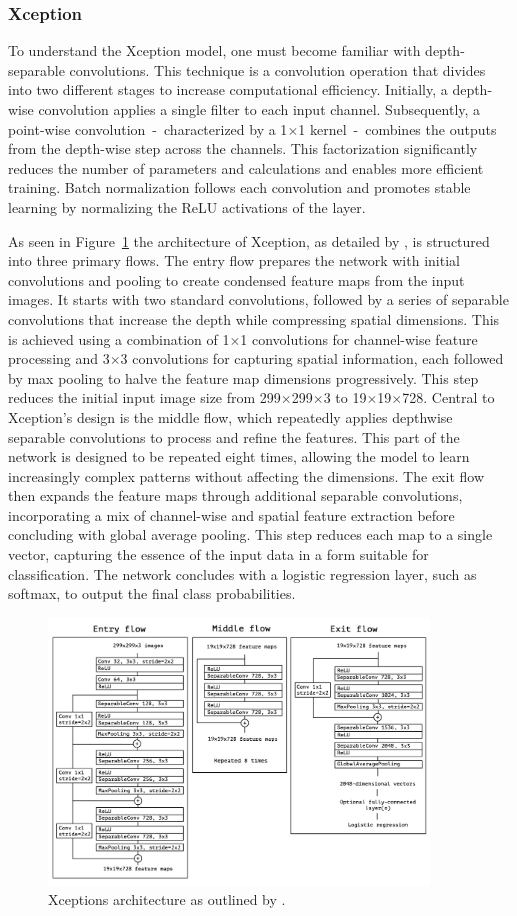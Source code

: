 \subsubsection{Xception}\label{xception}

To understand the Xception model, one must become familiar with depth-separable convolutions. This technique is a convolution operation that divides into two different stages to increase computational efficiency. Initially, a depth-wise convolution applies a single filter to each input channel. Subsequently, a point-wise convolution~-~characterized by a 1$\times$1 kernel~-~combines the outputs from the depth-wise step across the channels. This factorization significantly reduces the number of parameters and calculations and enables more efficient training. Batch normalization follows each convolution and promotes stable learning by normalizing the ReLU activations of the layer.

As seen in Figure~\ref{fig:xceptionArchitecture} the architecture of Xception, as detailed by \citep{chollet2017xception}, is structured into three primary flows. The entry flow prepares the network with initial convolutions and pooling to create condensed feature maps from the input images. It starts with two standard convolutions, followed by a series of separable convolutions that increase the depth while compressing spatial dimensions. This is achieved using a combination of 1$\times$1 convolutions for channel-wise feature processing and 3$\times$3 convolutions for capturing spatial information, each followed by max pooling to halve the feature map dimensions progressively. This step reduces the initial input image size from 299$\times$299$\times$3 to 19$\times$19$\times$728. Central to Xception's design is the middle flow, which repeatedly applies depthwise separable convolutions to process and refine the features. This part of the network is designed to be repeated eight times, allowing the model to learn increasingly complex patterns without affecting the dimensions. The exit flow then expands the feature maps through additional separable convolutions, incorporating a mix of channel-wise and spatial feature extraction before concluding with global average pooling. This step reduces each map to a single vector, capturing the essence of the input data in a form suitable for classification. The network concludes with a logistic regression layer, such as softmax, to output the final class probabilities.

\begin{figure}[ht]
    \centering
    \includegraphics[width=0.9\textwidth]{figures/xception_architecture.png}
    \caption{Xceptions architecture as outlined by \citeauthor{chollet2017xception}.}\label{fig:xceptionArchitecture}
\end{figure}